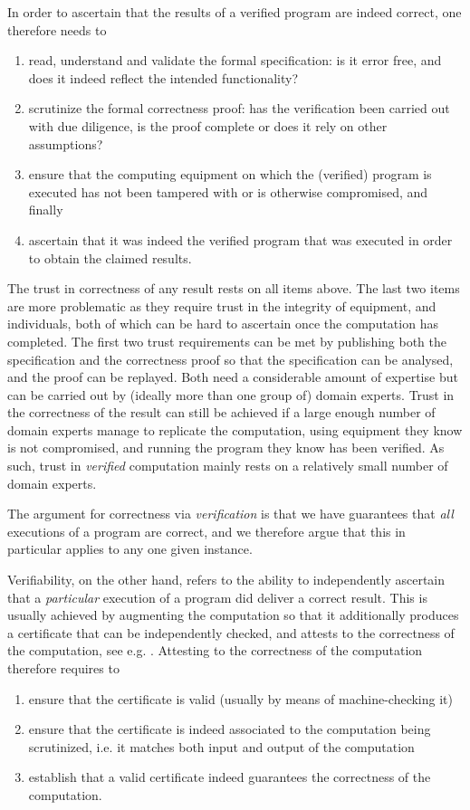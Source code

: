 \documentclass{llncs}
\begin{document}
In order to ascertain that the results of a verified program are
indeed correct, one therefore needs to
\begin{enumerate}
\item read, understand and validate the formal specification: is it
error free, and does it indeed reflect the intended functionality?
\item scrutinize the formal correctness proof: has the verification
been carried out with due diligence, is the proof complete or does
it rely on other assumptions?
\item ensure that the computing equipment on which the (verified)
program is executed has not been tampered with or is otherwise
compromised, and finally
\item ascertain that it was indeed the verified program that was
executed in order to obtain the claimed results.
\end{enumerate}

\noindent
The trust in correctness of any result rests on all items above.
The last two items are
more problematic as they require trust in the integrity of
equipment, and individuals, both of which can be hard to ascertain
once the computation has completed. The
first two trust requirements can be met by publishing both the
specification and the correctness proof so that the specification
can be analysed, and the proof can be replayed. Both need a
considerable amount of expertise but can be carried out by (ideally
more than one group of) domain experts. Trust in the correctness of the
result can still be achieved if a large enough number of domain
experts manage to replicate the computation, using equipment they
know is not compromised, and running the program they know has been
verified. As such, trust in \emph{verified} computation mainly rests
on a relatively small number of domain experts.

The argument for correctness via \emph{verification} is that we have
guarantees that 
\emph{all} executions of a program are correct, and we 
therefore argue that this in particular applies to any one given
instance.

Verifiability, on the other hand, refers to the ability to
independently ascertain that a \emph{particular} execution of a
program did deliver a correct result. This is usually achieved by
augmenting the computation so that it additionally produces a certificate that can be
independently checked, and attests to the correctness of the
computation, see e.g. \cite{Arkoudas:2007:CJM}. Attesting to the correctness of the computation
therefore requires to
\begin{enumerate}
\item ensure that the certificate is valid (usually by means of
machine-checking it)
\item ensure that the certificate is indeed associated to the
computation being scrutinized, i.e. it matches both input and output
of the computation
\item \label{it:cert} establish that a valid certificate indeed guarantees the
correctness of the computation.
\end{enumerate}
\end{document}
